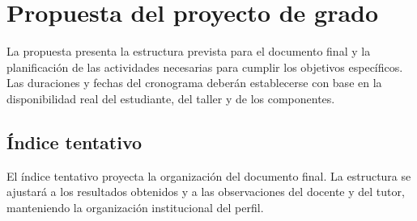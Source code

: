 
\chapter{Propuesta del proyecto de grado}
\label{chap:propuesta}

La propuesta presenta la estructura prevista para el documento final y la
planificación de las actividades necesarias para cumplir los objetivos
específicos. Las duraciones y fechas del cronograma deberán establecerse con
base en la disponibilidad real del estudiante, del taller y de los componentes.

\section{Índice tentativo}
\label{sec:indice_tentativo}

El índice tentativo proyecta la organización del documento final. La estructura
se ajustará a los resultados obtenidos y a las observaciones del docente y del
tutor, manteniendo la organización institucional del perfil.

